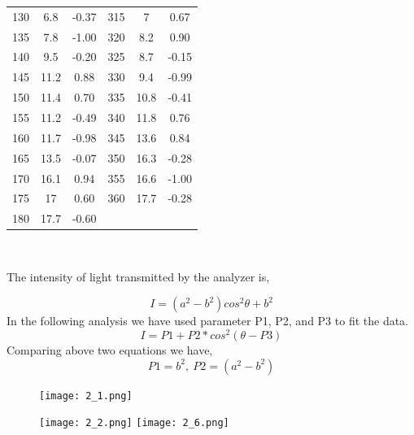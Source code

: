 \documentclass[12pt]{report}
\begin{document}
\begin{center}
\begin{tabular}{ |c|c|c|c|c|c| }
130 & 6.8  & -0.37 & 315 & 7    & 0.67  \\
135 & 7.8  & -1.00 & 320 & 8.2  & 0.90  \\
140 & 9.5  & -0.20 & 325 & 8.7  & -0.15 \\
145 & 11.2 & 0.88  & 330 & 9.4  & -0.99 \\
150 & 11.4 & 0.70  & 335 & 10.8 & -0.41 \\
155 & 11.2 & -0.49 & 340 & 11.8 & 0.76  \\
160 & 11.7 & -0.98 & 345 & 13.6 & 0.84  \\
165 & 13.5 & -0.07 & 350 & 16.3 & -0.28 \\
170 & 16.1 & 0.94  & 355 & 16.6 & -1.00 \\
175 & 17   & 0.60  & 360 & 17.7 & -0.28 \\
180 & 17.7 & -0.60 &     &      &       \\
		\hline
\end{tabular}
\\
\end{center}

The intensity of light transmitted by the analyzer is,

\[I=(a^2-b^2)cos^2{\theta}+b^2\]   
In the following analysis we have used parameter P1, P2, and P3 to fit the data. 
\[I=P1+P2*cos^2{(\theta-P3)}\] 
Comparing above two equations we have,
\[P1=b^2,\    P2=(a^2-b^2)\]

\begin{figure}[h!]
	\centering
	\texttt{[image: 2\_1.png]}
\end{figure}
\newpage
\begin{figure}[h!]
	\centering
	\texttt{[image: 2\_2.png]}
	\texttt{[image: 2\_6.png]}
\end{figure}
\end{document}
